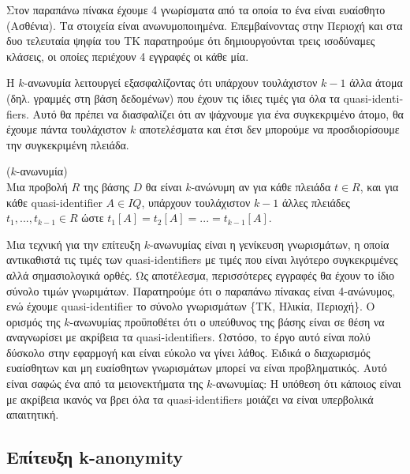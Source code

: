 Στον παραπάνω πίνακα έχουμε 4 γνωρίσματα από τα οποία το ένα είναι ευαίσθητο (Ασθένια). Τα στοιχεία είναι ανωνυμοποιημένα. Επεμβαίνοντας στην Περιοχή και στα δυο τελευταία ψηφία του ΤΚ παρατηρούμε ότι δημιουργούνται τρεις ισοδύναμες κλάσεις, οι οποίες περιέχουν 4 εγγραφές οι κάθε μία.

Η $k$-ανωνυμία λειτουργεί εξασφαλίζοντας ότι υπάρχουν τουλάχιστον $k-1$ άλλα άτομα (δηλ. γραμμές στη βάση δεδομένων) που έχουν τις ίδιες τιμές για όλα τα \textlatin{quasi-identifiers}. Αυτό θα πρέπει να διασφαλίζει ότι αν ψάχνουμε για ένα συγκεκριμένο άτομο, θα έχουμε πάντα τουλάχιστον $k$ αποτελέσματα και έτσι δεν μπορούμε να προσδιορίσουμε την συγκεκριμένη πλειάδα.

\begin{definition}($k$-ανωνυμία)\\
Μια προβολή $R$ της βάσης $D$ θα είναι $k$-ανώνυμη αν για κάθε πλειάδα $t\in R$, και για κάθε \textlatin{quasi-identifier} $A\in IQ$, υπάρχουν τουλάχιστον $k-1$ άλλες πλειάδες $t_1,...,t_{k-1} \in R$ ώστε $t_1[A]=t_2[A]=...=t_{k-1}[A]$.
\end{definition}

Μια τεχνική για την επίτευξη $k$-ανωνυμίας είναι η γενίκευση γνωρισμάτων, η οποία αντικαθιστά τις τιμές των \textlatin{quasi-identifiers} με τιμές που είναι λιγότερο συγκεκριμένες αλλά σημασιολογικά ορθές. Ως αποτέλεσμα, περισσότερες εγγραφές θα έχουν το ίδιο σύνολο τιμών γνωριμάτων. Παρατηρούμε ότι ο παραπάνω πίνακας είναι 4-ανώνυμος, ενώ έχουμε \textlatin{quasi-identifier} το σύνολο γνωρισμάτων \{ΤΚ, Ηλικία, Περιοχή\}. Ο ορισμός της $k$-ανωνυμίας προϋποθέτει ότι ο υπεύθυνος της βάσης είναι σε θέση να αναγνωρίσει με ακρίβεια τα \textlatin{quasi-identifiers}. Ωστόσο, το έργο αυτό είναι πολύ δύσκολο στην εφαρμογή και είναι εύκολο να γίνει λάθος. Ειδικά ο διαχωρισμός ευαίσθητων και μη ευαίσθητων γνωρισμάτων μπορεί να είναι προβληματικός. Αυτό είναι σαφώς ένα από τα μειονεκτήματα της $k$-ανωνυμίας: Η υπόθεση ότι κάποιος είναι με ακρίβεια ικανός να βρει όλα τα \textlatin{quasi-identifiers} μοιάζει να είναι υπερβολικά απαιτητική.

\subsection{Επίτευξη \textlatin{k-anonymity}}

